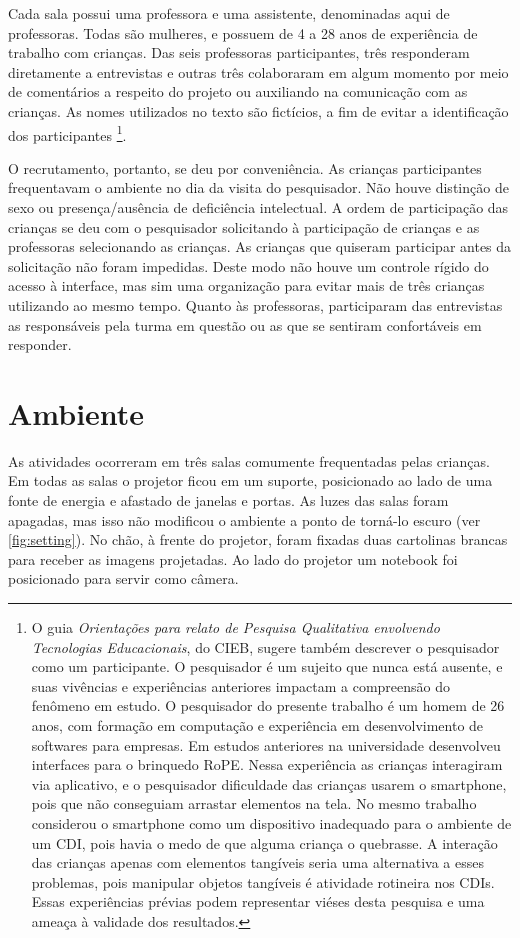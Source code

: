 Cada sala possui uma professora e uma assistente, denominadas aqui de professoras. Todas são mulheres, e possuem de 4 a 28 anos de experiência de trabalho com crianças. Das seis professoras participantes, três responderam diretamente a entrevistas e outras três colaboraram em algum momento por meio de comentários a respeito do projeto ou auxiliando na comunicação com as crianças. As nomes utilizados no texto são fictícios, a fim de evitar a identificação dos participantes
\footnote{
    O guia \textit{Orientações para relato de Pesquisa Qualitativa envolvendo Tecnologias Educacionais}, do \ac{CIEB}, sugere também descrever o pesquisador como um participante. O pesquisador é um sujeito que nunca está ausente, e suas vivências e experiências anteriores impactam a compreensão do fenômeno em estudo. O pesquisador do presente trabalho é um homem de 26 anos, com formação em computação e experiência em desenvolvimento de softwares para empresas. Em estudos anteriores na universidade desenvolveu interfaces para o brinquedo RoPE. Nessa experiência as crianças interagiram via aplicativo, e o pesquisador dificuldade das crianças usarem o smartphone, pois que não conseguiam arrastar elementos na tela. No mesmo trabalho considerou o smartphone como um dispositivo inadequado para o ambiente de um CDI, pois havia o medo de que alguma criança o quebrasse. A interação das crianças apenas com elementos tangíveis seria uma alternativa a esses problemas, pois manipular objetos tangíveis é atividade rotineira nos CDIs. Essas experiências prévias podem representar viéses desta pesquisa e uma ameaça à validade dos resultados.
}.

O recrutamento, portanto, se deu por conveniência. As crianças participantes frequentavam o ambiente no dia da visita do pesquisador. Não houve distinção de sexo ou presença/ausência de deficiência intelectual. A ordem de participação das crianças se deu com o pesquisador solicitando à participação de crianças e as professoras selecionando as crianças. As crianças que quiseram participar antes da solicitação não foram impedidas. Deste modo não houve um controle rígido do acesso à interface, mas sim uma organização para evitar mais de três crianças utilizando ao mesmo tempo. Quanto às professoras, participaram das entrevistas as responsáveis pela turma em questão ou as que se sentiram confortáveis em responder.

\section{Ambiente}
\label{sec:ambiente}
As atividades ocorreram em três salas comumente frequentadas pelas crianças. Em todas as salas o projetor ficou em um suporte, posicionado ao lado de uma fonte de energia e afastado de janelas e portas. As luzes das salas foram apagadas, mas isso não modificou o ambiente a ponto de torná-lo escuro (ver \autoref{fig:setting}). No chão, à frente do projetor, foram fixadas duas cartolinas brancas para receber as imagens projetadas. Ao lado do projetor um notebook foi posicionado para servir como câmera. 

